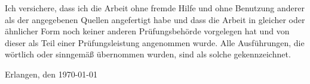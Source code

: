 
\cleardoublepage
\thispagestyle{empty}

Ich versichere, dass ich die Arbeit ohne fremde Hilfe und ohne Benutzung anderer als der angegebenen Quellen angefertigt
habe und dass die Arbeit in gleicher oder ähnlicher Form noch keiner anderen Prüfungsbehörde vorgelegen hat und von
dieser als Teil einer Prüfungsleistung angenommen wurde. Alle Ausführungen, die wörtlich oder sinngemäß übernommen
wurden, sind als solche gekennzeichnet.

\vspace*{2cm}

Erlangen, den \today
\hspace{1.3cm}

\balanguage
